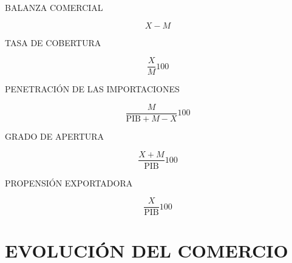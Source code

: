 \documentclass[12pt]{book}
\begin{document}
BALANZA COMERCIAL

\[X - M\]

TASA DE COBERTURA

\[\frac{X}{M}100\]

PENETRACIÓN DE LAS IMPORTACIONES

\[\frac{M}{\text{PIB} + M - X} 100\]

GRADO DE APERTURA

\[\frac{X+M}{\text{PIB}} 100\]

PROPENSIÓN EXPORTADORA

\[\frac{X}{\text{PIB}} 100\]

    \section{EVOLUCIÓN DEL COMERCIO}\label{evoluciuxf3n-del-comercio}
\end{document}
